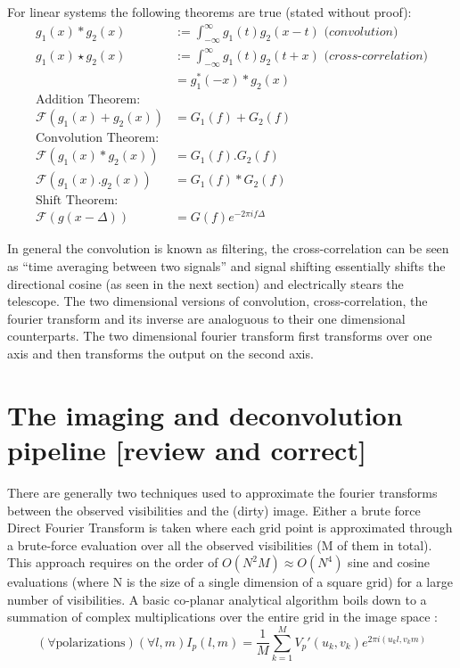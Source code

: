For linear systems the following theorems are true (stated without proof):
\begin{equation*}
  \begin{split}
    g_1(x)*g_2(x) &:= \int_{-\infty}^{\infty}g_1(t)g_2(x-t)\textit{ (convolution)}\\
    g_1(x)\star g_2(x) &:= \int_{-\infty}^{\infty}g_1(t)g_2(t+x)\textit{ (cross-correlation)}\\
    &=g_1^*(-x)*g_2(x)\\
    \text{Addition Theorem:}\\
    \mathcal{F}(g_1(x)+g_2(x)) &= G_1(f)+G_2(f)\\
    \text{Convolution Theorem:}\\
    \mathcal{F}(g_1(x)*g_2(x)) &=G_1(f).G_2(f)\\
    \mathcal{F}(g_1(x).g_2(x)) &=G_1(f)*G_2(f)\\
    \text{Shift Theorem:}\\
    \mathcal{F}(g(x-\Delta))&=G(f)e^{-2\pi if\Delta}
  \end{split}
\end{equation*}

In general the convolution is known as filtering, the cross-correlation can be seen as ``time averaging between two signals'' and signal shifting essentially shifts the directional cosine (as seen in the next section) and electrically
stears the telescope. The two dimensional versions of convolution, cross-correlation, the fourier transform and its inverse are analoguous to their one dimensional counterparts. The two dimensional fourier transform first transforms
over one axis and then transforms the output on the second axis. 
 \section{The imaging and deconvolution pipeline [review and correct]}
 There are generally two techniques used to approximate the fourier transforms between the observed visibilities and the (dirty) image. Either a brute force Direct Fourier Transform is taken where each grid point is approximated through a brute-force
 evaluation over all the observed visibilities (M of them in total). This approach requires on the order of $O(N^2M) \approx O(N^4)$ sine and cosine evaluations (where N is the size of a single dimension of a square grid) for a large number of visibilities. A basic co-planar analytical 
 algorithm boils down to a summation of complex multiplications over the entire grid in the image space \cite[Lecture 7]{taylor1999synthesis}: 
 \begin{equation}
  (\forall \text{polarizations})(\forall l,m) I_{p}(l,m) = \frac{1}{M}\sum_{k=1}^{M}{V_p'(u_k,v_k)e^{2\pi i (u_kl,v_km)}}
 \end{equation}
 
